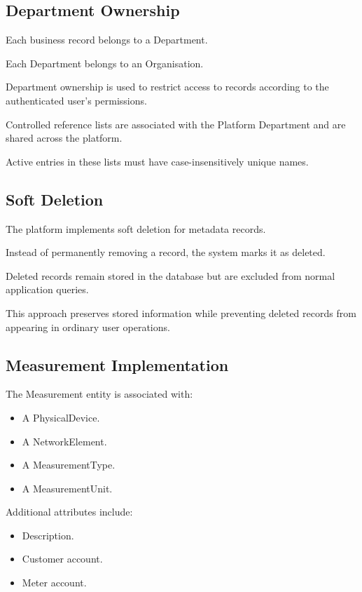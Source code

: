 \documentclass[11pt,a4paper]{article}
\begin{document}
\subsection{Department Ownership}

Each business record belongs to a Department.

Each Department belongs to an Organisation.

Department ownership is used to restrict access
to records according to the authenticated user's
permissions.

Controlled reference lists are associated with
the Platform Department and are shared across
the platform.

Active entries in these lists must have
case-insensitively unique names.

\subsection{Soft Deletion}

The platform implements soft deletion for metadata
records.

Instead of permanently removing a record,
the system marks it as deleted.

Deleted records remain stored in the database
but are excluded from normal application queries.

This approach preserves stored information while
preventing deleted records from appearing in
ordinary user operations.

\subsection{Measurement Implementation}

The Measurement entity is associated with:

\begin{itemize}
    \item A PhysicalDevice.
    \item A NetworkElement.
    \item A MeasurementType.
    \item A MeasurementUnit.
\end{itemize}

Additional attributes include:

\begin{itemize}
    \item Description.
    \item Customer account.
    \item Meter account.
\end{itemize}
\end{document}
